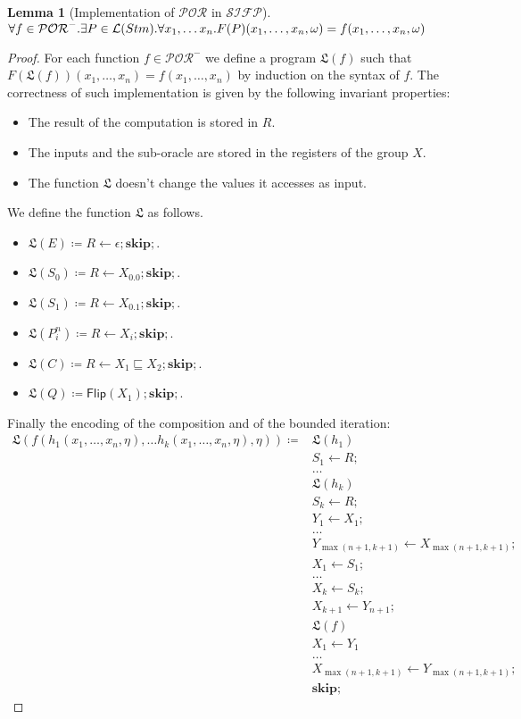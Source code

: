 \documentclass[10pt]{amsart}
\newcommand{\POR}{\mathcal{POR}}
\newcommand{\SIFP}{\mathcal{SIFP}}
\newcommand{\vone}{x}
\newcommand{\lang}[1]{\mathcal L(#1)}
\newcommand{\fl}{\mathsf{Flip}}
\newcommand{\sk}{\mathbf{skip};}
\newcommand{\takes}{\leftarrow}
\newcommand{\LL}{\mathfrak L}
\newtheorem{lemma}{Lemma}
\begin{document}
\begin{lemma}[Implementation of $\POR$ in $\SIFP$]
\label{lemma:portosifp}
$\forall f \in \POR^-.\exists P\in \lang {Stm}.\\\forall \vone_1, \ldots \vone_n. F(P)(\vone_1, \ldots, \vone_n, \omega)=f(\vone_1, \ldots, \vone_n, \omega)$
\end{lemma}
\begin{proof}
For each function $f \in \POR^-$ we define a program $\LL(f)$ such that $F(\LL(f))(x_1, \ldots, x_n)=f(x_1, \ldots, x_n)$ by induction on the syntax of $f$. The correctness of such implementation is given by the following invariant properties:
\begin{itemize}
\item The result of the computation is stored in $R$.
\item The inputs and the sub-oracle are stored in the registers of the group $X$.
\item The function $\LL$ doesn't change the values it accesses as input.
\end{itemize}

We define the function $\LL$ as follows.
\begin{itemize}
\item $\LL(E)\coloneqq R \takes \epsilon; \sk$.
\item $\LL(S_0)\coloneqq R \takes X_0.0; \sk$.
\item $\LL(S_1)\coloneqq R \takes X_0.1; \sk$.
\item $\LL({P}^n_i)\coloneqq R \takes X_i; \sk$.
\item $\LL(C)\coloneqq R \takes X_1 \sqsubseteq X_2; \sk$.
\item $\LL(Q)\coloneqq \fl(X_1); \sk$.
\end{itemize}

Finally the encoding of the composition and of the bounded iteration:
\begin{align*}
\LL(f(h_1(\vone_1,\ldots, \vone_n, \eta), \ldots h_k(\vone_1,\ldots, \vone_n, \eta), \eta))\coloneqq& \LL(h_1)\\
&S_1 \takes R;\\
&\ldots\\
&\LL(h_k)\\
&S_k \takes R;\\
&Y_1 \takes X_1;\\
& \ldots\\
& Y_{\max(n+1, k+1)} \takes X_{\max(n+1, k+1)};\\
& X_1 \takes S_1;\\
& \ldots\\
& X_k \takes S_k;\\
& X_{k+1} \takes Y_{n+1};\\
&\LL(f)\\
& X_1 \takes Y_1\\
&\ldots\\
&X_{\max(n+1, k+1)} \takes Y_{\max(n+1, k+1)};\\
&\sk
\end{align*}


\end{proof}
\end{document}
